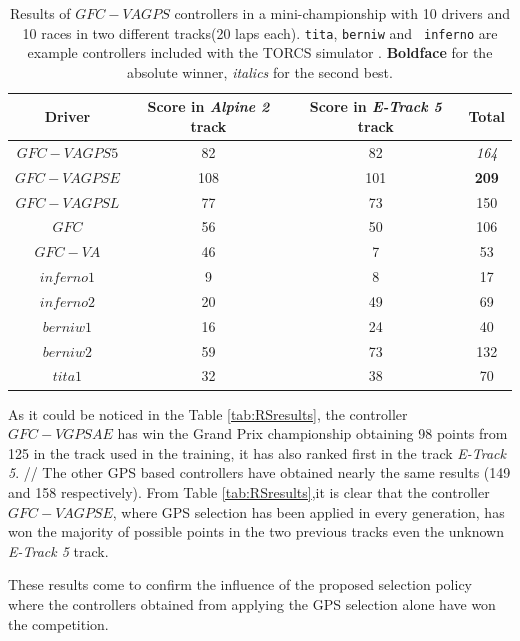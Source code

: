 \documentclass[10pt,journal,compsoc]{IEEEtran}
\begin{document}
%
\begin{table}[ht]
	\centering
	{\scriptsize
		\caption{ Results of $GFC-VAGPS$ controllers in a mini-championship with 10 drivers and 10
			races in two different tracks(20 laps each). {\tt tita}, {\tt berniw} and {\tt
				inferno} are example controllers included with the TORCS
			simulator \cite{torcs4}. {\bf Boldface}
                      for the absolute winner, {\em italics} for the second
                    best.}
		{
			\begin{tabular}{|c|c|c||c|}
				\hline
				Driver&Score in \textit{Alpine 2} track &Score in \textit{E-Track 5} track &Total\\
				\hline
				\hline	
				$GFC-VAGPS5$&	82&	82&	{\em 164}\\
				$GFC-VAGPSE$&	108&    101&	{\bf 209}\\
				$GFC-VAGPSL$&	77&	73&	150\\
				$GFC$&	56&	50&	106\\
				$GFC-VA$&	46&	7&	53\\
				$inferno1$&	9&	8&	17\\
				$inferno2$&	20&	49&	69\\
				$berniw1$&	16&	24&	40\\
				$berniw2$&	59&	73&	132\\
				$tita1$&	32&	38&	70\\			
				\hline
				
			\end{tabular}
		}\label{tab:VaryingalphaRSresults}
	}
\end{table}
%
As it could be noticed in the Table \ref{tab:RSresults}, the controller $GFC-VGPSAE$ has win the Grand Prix championship obtaining 98 points from 125 in the track used in the training, it has also ranked first in the track  \textit{E-Track 5}. //
The other GPS based controllers have obtained nearly the same results (149 and 158 respectively).
From Table \ref{tab:RSresults},it is clear that the controller $GFC-VAGPSE$, where GPS selection has been applied in every generation, has won the majority of possible points in the two previous tracks even the unknown \textit{E-Track 5}  track.

These results come to confirm the influence of the proposed selection policy where the controllers obtained from applying the GPS selection alone have won the competition.
 
\end{document}

